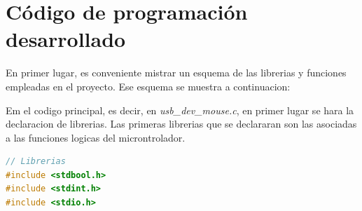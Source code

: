 \documentclass[a4paper,twoside]{article}
\begin{document}
\section{Código de programación desarrollado}
En primer lugar, es conveniente mistrar un esquema de las librerias y funciones empleadas en el proyecto. Ese esquema se muestra a continuacion:


\newpage
Em el codigo principal, es decir, en \textit{usb\_dev\_mouse.c}, en primer lugar se hara la declaracion de librerias. Las primeras librerias que se declararan son las asociadas a las funciones logicas del microntrolador.
\begin{lstlisting}[language=C,style=CStyle, caption={Inclusion de librerias}]
// Librerias
#include <stdbool.h>
#include <stdint.h>
#include <stdio.h>
\end{lstlisting}

\newpage
\end{document}
